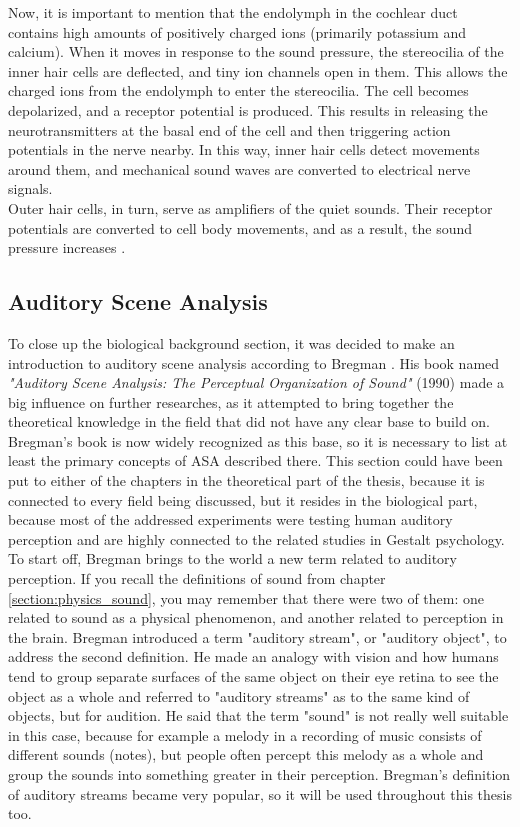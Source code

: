Now, it is important to mention that the endolymph in the cochlear duct contains high amounts of positively charged ions (primarily potassium and calcium). When it moves in response to the sound pressure, the stereocilia of the inner hair cells are deflected, and tiny ion channels open in them. This allows the charged ions from the endolymph to enter the stereocilia. The cell becomes depolarized, and a receptor potential is produced. This results in releasing the neurotransmitters at the basal end of the cell and then triggering action potentials in the nerve nearby. In this way, inner hair cells detect movements around them, and mechanical sound waves are converted to electrical nerve signals.\\

Outer hair cells, in turn, serve as amplifiers of the quiet sounds. Their receptor potentials are converted to cell body movements, and as a result, the sound pressure increases \cite{Hudspeth2008}.

\subsection{Auditory Scene Analysis}\label{section:biology_asa}

To close up the biological background section, it was decided to make an introduction to auditory scene analysis according to Bregman \cite{Bregman1990}. His book named \textit{"Auditory Scene Analysis: The Perceptual Organization of Sound"} (1990) made a big influence on further researches, as it attempted to bring together the theoretical knowledge in the field that did not have any clear base to build on. Bregman's book is now widely recognized as this base, so it is necessary to list at least the primary concepts of ASA described there. This section could have been put to either of the chapters in the theoretical part of the thesis, because it is connected to every field being discussed, but it resides in the biological part, because most of the addressed experiments were testing human auditory perception and are highly connected to the related studies in Gestalt psychology.\\

To start off, Bregman brings to the world a new term related to auditory perception. If you recall the definitions of sound from chapter \ref{section:physics_sound}, you may remember that there were two of them: one related to sound as a physical phenomenon, and another related to perception in the brain. Bregman introduced a term "auditory stream", or "auditory object", to address the second definition. He made an analogy with vision and how humans tend to group separate surfaces of the same object on their eye retina to see the object as a whole and referred to "auditory streams" as to the same kind of objects, but for audition. He said that the term "sound" is not really well suitable in this case, because for example a melody in a recording of music consists of different sounds (notes), but people often percept this melody as a whole and group the sounds into something greater in their perception. Bregman's definition of auditory streams became very popular, so it will be used throughout this thesis too.\\

